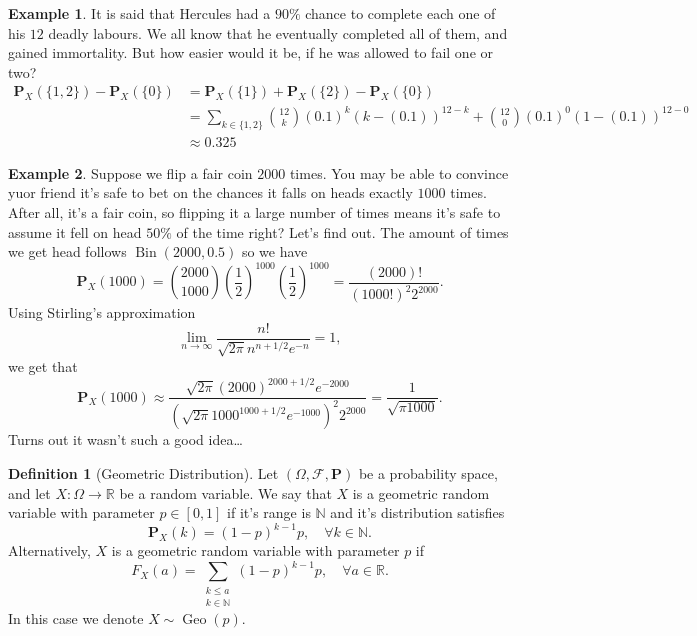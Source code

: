 \documentclass[11pt,a4paper]{article}
\theoremstyle{definition}
\newtheorem{definition}{Definition}[section]
\newtheorem{example}{Example}[section]
\theoremstyle{plain}
\DeclareMathOperator{\Bin}{Bin}
\DeclareMathOperator{\Geo}{Geo}
\newcommand{\N}{\mathbb{N}}
\newcommand{\R}{\mathbb{R}}
\begin{document}
  \begin{example}
  It is said that Hercules had a $90\%$ chance to complete each
  one of his $12$ deadly labours. We all know that he eventually completed
  all of them, and gained immortality. But how easier would it be, if he
  was allowed to fail one or two?
  \begin{align*}
    \mathbf P_X(\{1,2\}) - \mathbf P_X(\{0\}) &=
    \mathbf P_X(\{1\}) + \mathbf P_X(\{2\}) - \mathbf P_X(\{0\}) \\ &=
    \sum_{k \in \{1,2\}}
    \binom{12}{k} (0.1)^k (k - (0.1))^{12-k} +
    \binom{12}{0} (0.1)^0 (1 - (0.1))^{12-0} \\ &\approx
    0.325
  \end{align*}
  \end{example}
  \begin{example}
    Suppose we flip a fair coin $2000$ times. You may be able to convince
    yuor friend it's safe to bet on the chances it falls on heads exactly
    $1000$ times. After all, it's a fair coin, so flipping it a large number
    of times means it's safe to assume it fell on head $50\%$ of the time
    right? Let's find out. The amount of times we get head follows
    $\Bin(2000,0.5)$ so we have
    \[
      \mathbf{P}_{X}(1000) =
      \binom{2000}{1000} \left(\frac{1}{2}\right)^{1000}
      \left(\frac{1}{2}\right)^{1000} =
      \frac{(2000)!}{(1000!)^{2}2^{2000}}.
    \]
    Using Stirling's approximation
    \[
      \lim_{n\rightarrow\infty}
      {\frac{n!}{\sqrt{2\pi}n^{n+1/2}e^{-n}}}=1,
    \]
    we get that
    \[
      \mathbf{P}_{X}(1000) \approx
      \frac{\sqrt{2\pi}(2000)^{2000+1/2}e^{-2000}}
          {({\sqrt{2\pi}}1000^{1000+1/2}e^{-1000})^{2}2^{2000}} =
      {\frac{1}{\sqrt{\pi 1000}}}.
    \]
    Turns out it wasn't such a good idea\dots
  \end{example}

  \begin{definition}[Geometric Distribution]
    Let $(\Omega ,\mathcal F, \mathbf P)$ be a probability space,
    and let $X \colon \Omega \to \R$ be a random variable.
    We say that $X$ is a geometric random variable with parameter
    $p \in [0,1]$ if it's range is $\N$ and it's distribution satisfies
    \[
      \mathbf P_X(k) = (1-p)^{k-1} p, \quad 
      \forall k \in \N.
    \]
    Alternatively, $X$ is a geometric random variable with parameter
    $p$ if
    \[
      F_X(a) = \sum_{\substack{k \le a \\ k \in \N}}
      (1-p)^{k-1} p, \quad \forall a \in \R.
    \]
    In this case we denote $X \sim \Geo(p)$.
  \end{definition}
  
\end{document}

